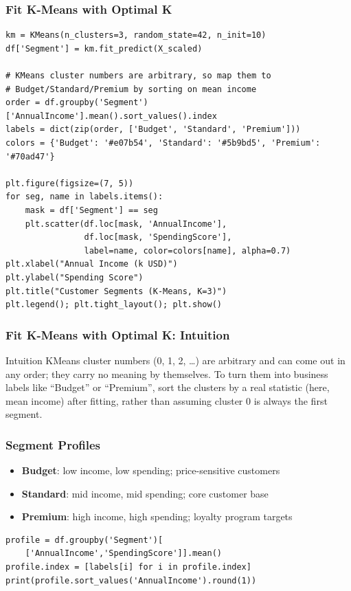 \begin{frame}[fragile]\frametitle{Fit K-Means with Optimal K}
\begin{lstlisting}
km = KMeans(n_clusters=3, random_state=42, n_init=10)
df['Segment'] = km.fit_predict(X_scaled)

# KMeans cluster numbers are arbitrary, so map them to
# Budget/Standard/Premium by sorting on mean income
order = df.groupby('Segment')['AnnualIncome'].mean().sort_values().index
labels = dict(zip(order, ['Budget', 'Standard', 'Premium']))
colors = {'Budget': '#e07b54', 'Standard': '#5b9bd5', 'Premium': '#70ad47'}

plt.figure(figsize=(7, 5))
for seg, name in labels.items():
    mask = df['Segment'] == seg
    plt.scatter(df.loc[mask, 'AnnualIncome'],
                df.loc[mask, 'SpendingScore'],
                label=name, color=colors[name], alpha=0.7)
plt.xlabel("Annual Income (k USD)")
plt.ylabel("Spending Score")
plt.title("Customer Segments (K-Means, K=3)")
plt.legend(); plt.tight_layout(); plt.show()
\end{lstlisting}
\end{frame}

\begin{frame}[fragile]\frametitle{Fit K-Means with Optimal K: Intuition}
\begin{block}{Intuition}
KMeans cluster numbers (0, 1, 2, \ldots) are arbitrary and can come out in any order;
they carry no meaning by themselves. To turn them into business labels like ``Budget'' or
``Premium'', sort the clusters by a real statistic (here, mean income) after fitting,
rather than assuming cluster 0 is always the first segment.
\end{block}
\end{frame}

\begin{frame}[fragile]\frametitle{Segment Profiles}
\begin{itemize}
\item \textbf{Budget}: low income, low spending; price-sensitive customers
\item \textbf{Standard}: mid income, mid spending; core customer base
\item \textbf{Premium}: high income, high spending; loyalty program targets
\end{itemize}
\begin{lstlisting}
profile = df.groupby('Segment')[
    ['AnnualIncome','SpendingScore']].mean()
profile.index = [labels[i] for i in profile.index]
print(profile.sort_values('AnnualIncome').round(1))
\end{lstlisting}
\end{frame}

